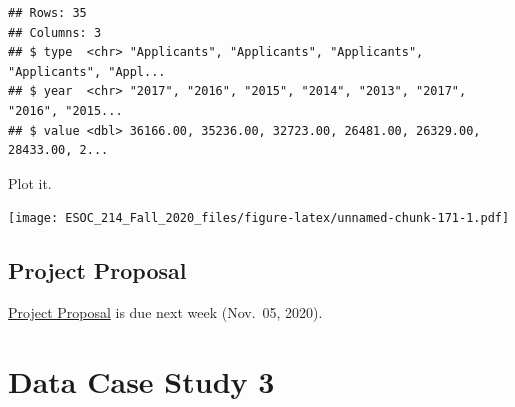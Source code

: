 \documentclass[
]{book}
\newenvironment{Shaded}{\begin{snugshade}}{\end{snugshade}}
\newcommand{\DataTypeTok}[1]{\textcolor[rgb]{0.13,0.29,0.53}{#1}}
\newcommand{\KeywordTok}[1]{\textcolor[rgb]{0.13,0.29,0.53}{\textbf{#1}}}
\newcommand{\NormalTok}[1]{#1}
\newcommand{\OperatorTok}[1]{\textcolor[rgb]{0.81,0.36,0.00}{\textbf{#1}}}
\newcommand{\OtherTok}[1]{\textcolor[rgb]{0.56,0.35,0.01}{#1}}
\newcommand{\StringTok}[1]{\textcolor[rgb]{0.31,0.60,0.02}{#1}}
\begin{document}
\begin{verbatim}
## Rows: 35
## Columns: 3
## $ type  <chr> "Applicants", "Applicants", "Applicants", "Applicants", "Appl...
## $ year  <chr> "2017", "2016", "2015", "2014", "2013", "2017", "2016", "2015...
## $ value <dbl> 36166.00, 35236.00, 32723.00, 26481.00, 26329.00, 28433.00, 2...
\end{verbatim}

Plot it.

\begin{Shaded}
\end{Shaded}

\texttt{[image: ESOC\_214\_Fall\_2020\_files/figure-latex/unnamed-chunk-171-1.pdf]}

\hypertarget{project-proposal}{%
\section{Project Proposal}\label{project-proposal}}

\href{final_project_docs/esoc214_project_proposal.pdf}{Project Proposal} is due next week (Nov.~05, 2020).

\hypertarget{data-case-study-3}{%
\chapter{Data Case Study 3}\label{data-case-study-3}}
\end{document}
